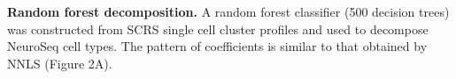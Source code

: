 \textbf{Random forest decomposition. }
A random forest classifier (500 decision trees) was constructed from SCRS single cell cluster profiles and used to decompose NeuroSeq cell types. The pattern of coefficients is similar to that obtained by NNLS (Figure 2A).
